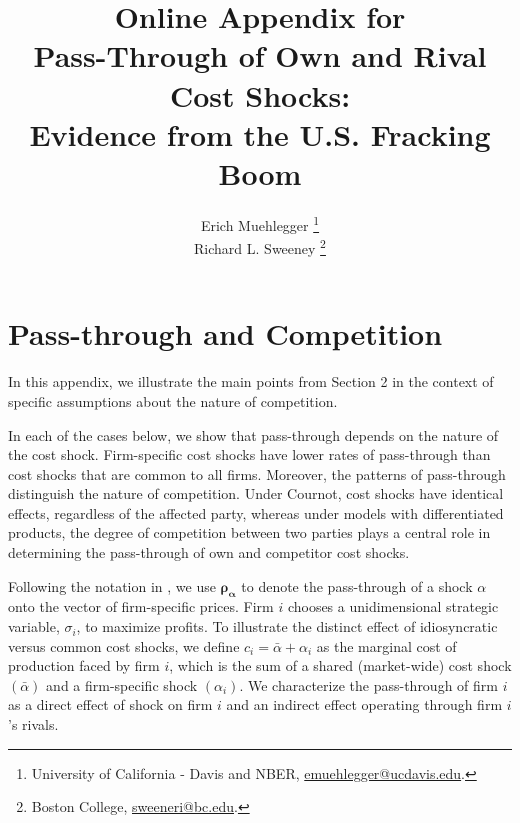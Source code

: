 \documentclass[12pt]{article}
\begin{document}
\singlespacing

\title{Online Appendix for \\ Pass-Through of Own and Rival Cost Shocks: \\ Evidence from the U.S. Fracking Boom}

\author{Erich Muehlegger \thanks{University of California - Davis and NBER, \protect\href{mailto:emuehlegger@ucdavis.edu}{emuehlegger@ucdavis.edu}.} \\
 Richard L. Sweeney \thanks{Boston College, \protect\href{mailto:sweeneri@bc.edu}{sweeneri@bc.edu}.}}

\maketitle

\appendix

\small

\section{Pass-through and Competition \label{App:Theory}}


\setcounter{table}{0} \renewcommand{\thetable}{\Alph{section}.\arabic{table}}
\setcounter{figure}{0} \renewcommand{\thefigure}{\Alph{section}.\arabic{figure}}

In this appendix, we illustrate the main points from Section 2 in the context of specific assumptions about the nature of competition.

In each of the cases below, we show that pass-through depends on the nature of the cost shock. Firm-specific cost shocks have lower rates of pass-through than cost shocks that are common to all firms. Moreover, the patterns of pass-through distinguish the nature of competition. Under Cournot, cost shocks have identical effects, regardless of the affected party, whereas under models with differentiated products, the degree of competition between two parties plays a central role in determining the pass-through of own and competitor cost shocks.

Following the notation in \citet{weyl_pass-through_2013}, we use $\boldsymbol{\rho_{\alpha}}$ to denote the pass-through of a shock $\alpha$ onto the vector of firm-specific prices.  Firm $i$ chooses a unidimensional strategic variable, $\sigma_i$, to maximize profits. To illustrate the distinct effect of idiosyncratic versus common cost shocks, we define $c_{i}=\bar{\alpha}+\alpha_{i}$ as the marginal cost of production faced by firm $i$, which is the sum of a shared (market-wide) cost shock $(\bar{\alpha})$ and a firm-specific shock $(\alpha_{i})$.  We characterize the pass-through of firm $i$ as a direct effect of shock on firm $i$ and an indirect effect operating through firm $i$'s rivals.
\end{document}
